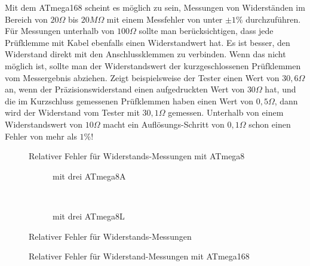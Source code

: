 Mit dem ATmega168 scheint es möglich zu sein, Messungen von Widerständen im
Bereich von \(20\Omega\) bis \(20M\Omega\) mit einem Messfehler von unter \(\pm1\%\) durchzuführen.
Für Messungen unterhalb von \(100\Omega\) sollte man berücksichtigen, dass jede Prüfklemme mit Kabel ebenfalls
einen Widerstandwert hat.
Es ist besser, den Widerstand direkt mit den Anschlussklemmen zu verbinden.
Wenn das nicht möglich ist, sollte man der Widerstandswert der kurzgeschlossenen Prüfklemmen vom Messergebnis abziehen.
Zeigt beispielsweise der Tester einen Wert von \(30,6\Omega\) an, wenn der Präzisionswiderstand einen aufgedruckten Wert von \(30\Omega\) hat, 
und die im Kurzschluss gemessenen Prüfklemmen haben einen Wert von \(0,5\Omega\), dann wird der Widerstand vom
Tester mit \(30,1\Omega\) gemessen.
Unterhalb von einem Widerstandswert von \(10\Omega\) macht ein Auflösungs-Schritt von \(0,1\Omega\) schon einen Fehler von mehr als \(1\%\)!

\begin{figure}[H]
\centering

\caption{Relativer Fehler für Widerstands-Messungen mit ATmega8 }
\label{fig:mega8res}
\end{figure}

\begin{figure}[H]
  \begin{subfigure}[b]{9cm}
    \centering
    \resizebox{9cm}{!}{}
    \caption{mit drei ATmega8A}
    \label{fig:mega8Ares}
  \end{subfigure}
  ~
  \begin{subfigure}[b]{9cm}
    \centering
    \resizebox{9cm}{!}{}
    \caption{mit drei ATmega8L}
    \label{fig:mega8Lres}
  \end{subfigure}
\caption{Relativer Fehler für Widerstands-Messungen}
\end{figure}

\begin{figure}[H]
\centering

\caption{Relativer Fehler für Widerstand-Messungen mit ATmega168 }
\label{fig:mega168res}
\end{figure}

